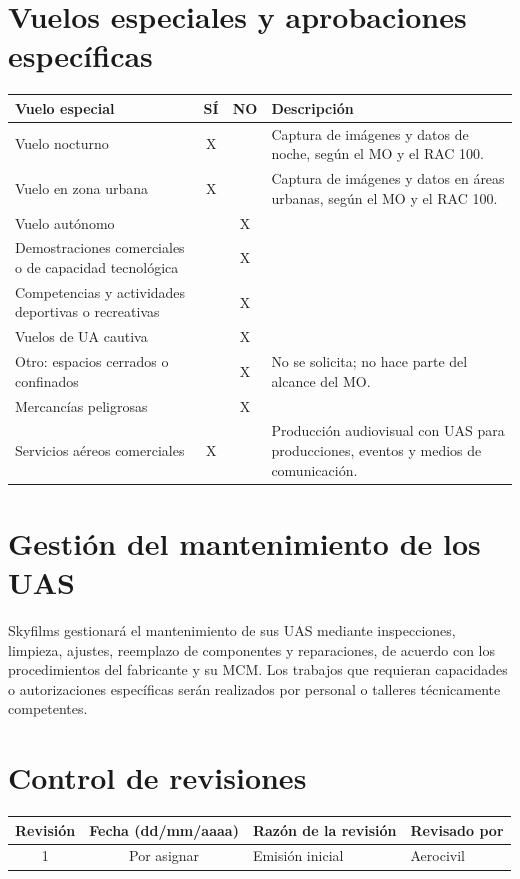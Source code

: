\section{Vuelos especiales y aprobaciones específicas}
\begin{table}[H]
    \centering
    \renewcommand{\arraystretch}{1.2}
    \begin{tabular}{|p{5cm}|c|c|p{5.2cm}|}
        \hline
        \rowcolor[gray]{0.9} \textbf{Vuelo especial} & \textbf{SÍ} & \textbf{NO} & \textbf{Descripción} \\ \hline
        Vuelo nocturno & X & & Captura de imágenes y datos de noche, según el MO y el RAC 100. \\ \hline
        Vuelo en zona urbana & X & & Captura de imágenes y datos en áreas urbanas, según el MO y el RAC 100. \\ \hline
        Vuelo autónomo & & X & \\ \hline
        Demostraciones comerciales o de capacidad tecnológica & & X & \\ \hline
        Competencias y actividades deportivas o recreativas & & X & \\ \hline
        Vuelos de UA cautiva & & X & \\ \hline
        Otro: espacios cerrados o confinados & & X & No se solicita; no hace parte del alcance del MO. \\ \hline
        Mercancías peligrosas & & X & \\ \hline
        Servicios aéreos comerciales & X & & Producción audiovisual con UAS para producciones, eventos y medios de comunicación. \\ \hline
    \end{tabular}
\end{table}

\section{Gestión del mantenimiento de los UAS}
Skyfilms gestionará el mantenimiento de sus UAS mediante inspecciones, limpieza, ajustes, reemplazo de componentes y reparaciones, de acuerdo con los procedimientos del fabricante y su MCM. Los trabajos que requieran capacidades o autorizaciones específicas serán realizados por personal o talleres técnicamente competentes.

\section{Control de revisiones}
\begin{table}[H]
    \centering
    \renewcommand{\arraystretch}{1.2}
    \begin{tabular}{|c|c|p{5cm}|p{4cm}|}
        \hline
        \rowcolor[gray]{0.9} \textbf{Revisión} & \textbf{Fecha (dd/mm/aaaa)} & \textbf{Razón de la revisión} & \textbf{Revisado por} \\ \hline
        1 & Por asignar & Emisión inicial & Aerocivil \\ \hline
    \end{tabular}
\end{table}
